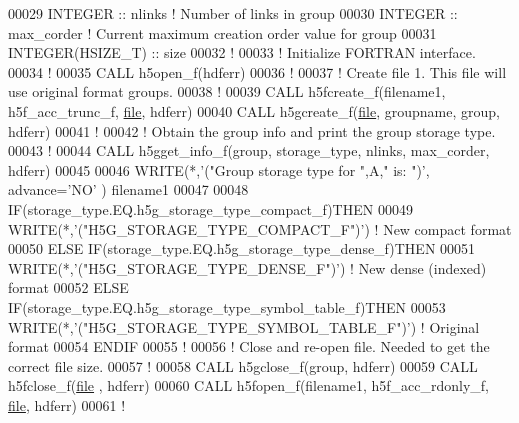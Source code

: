 \begin{DoxyCode}
00029   \textcolor{keywordtype}{INTEGER} :: nlinks       \textcolor{comment}{! Number of links in group}
00030   \textcolor{keywordtype}{INTEGER} :: max\_corder   \textcolor{comment}{! Current maximum creation order value for group}
00031   \textcolor{keywordtype}{INTEGER(HSIZE\_T)} :: size
00032   \textcolor{comment}{!}
00033   \textcolor{comment}{! Initialize FORTRAN interface.}
00034   \textcolor{comment}{!}
00035   \textcolor{keyword}{CALL }h5open\_f(hdferr)
00036   \textcolor{comment}{!}
00037   \textcolor{comment}{! Create file 1.  This file will use original format groups.}
00038   \textcolor{comment}{!}
00039   \textcolor{keyword}{CALL }h5fcreate\_f(filename1, h5f\_acc\_trunc\_f, \hyperlink{structfile}{file}, hdferr)
00040   \textcolor{keyword}{CALL }h5gcreate\_f(\hyperlink{structfile}{file}, groupname, group, hdferr)
00041   \textcolor{comment}{!}
00042   \textcolor{comment}{! Obtain the group info and print the group storage type.}
00043   \textcolor{comment}{!}
00044   \textcolor{keyword}{CALL }h5gget\_info\_f(group, storage\_type, nlinks, max\_corder, hdferr)
00045 
00046   \textcolor{keyword}{WRITE}(*,\textcolor{stringliteral}{'("Group storage type for ",A," is: ")'}, advance=\textcolor{stringliteral}{'NO'} ) filename1
00047 
00048   \textcolor{keywordflow}{IF}(storage\_type.EQ.h5g\_storage\_type\_compact\_f)\textcolor{keywordflow}{THEN}
00049      \textcolor{keyword}{WRITE}(*,\textcolor{stringliteral}{'("H5G\_STORAGE\_TYPE\_COMPACT\_F")'}) \textcolor{comment}{! New compact format}
00050   \textcolor{keywordflow}{ELSE} \textcolor{keywordflow}{IF}(storage\_type.EQ.h5g\_storage\_type\_dense\_f)\textcolor{keywordflow}{THEN}
00051      \textcolor{keyword}{WRITE}(*,\textcolor{stringliteral}{'("H5G\_STORAGE\_TYPE\_DENSE\_F")'}) \textcolor{comment}{! New dense (indexed) format}
00052   \textcolor{keywordflow}{ELSE} \textcolor{keywordflow}{IF}(storage\_type.EQ.h5g\_storage\_type\_symbol\_table\_f)\textcolor{keywordflow}{THEN}
00053      \textcolor{keyword}{WRITE}(*,\textcolor{stringliteral}{'("H5G\_STORAGE\_TYPE\_SYMBOL\_TABLE\_F")'}) \textcolor{comment}{! Original format}
00054 \textcolor{keywordflow}{  ENDIF}
00055   \textcolor{comment}{!}
00056   \textcolor{comment}{! Close and re-open file.  Needed to get the correct file size.}
00057   \textcolor{comment}{!}
00058   \textcolor{keyword}{CALL }h5gclose\_f(group, hdferr)
00059   \textcolor{keyword}{CALL }h5fclose\_f(\hyperlink{structfile}{file} , hdferr)
00060   \textcolor{keyword}{CALL }h5fopen\_f(filename1, h5f\_acc\_rdonly\_f, \hyperlink{structfile}{file}, hdferr)
00061   \textcolor{comment}{!}

\end{DoxyCode}
